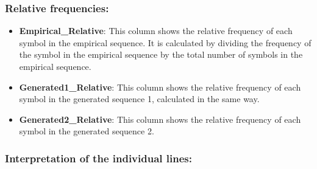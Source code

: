 \documentclass[
]{article}
\begin{document}
\subsubsection{\texorpdfstring{\textbf{Relative
frequencies:}}{Relative frequencies:}}\label{relative-frequencies}

\begin{itemize}
\item
  \textbf{Empirical\_Relative}: This column shows the relative frequency
  of each symbol in the empirical sequence. It is calculated by dividing
  the frequency of the symbol in the empirical sequence by the total
  number of symbols in the empirical sequence.
\item
  \textbf{Generated1\_Relative}: This column shows the relative
  frequency of each symbol in the generated sequence 1, calculated in
  the same way.
\item
  \textbf{Generated2\_Relative}: This column shows the relative
  frequency of each symbol in the generated sequence 2.
\end{itemize}

\subsubsection{\texorpdfstring{\textbf{Interpretation of the individual
lines:}}{Interpretation of the individual lines:}}\label{interpretation-of-the-individual-lines}
\end{document}
